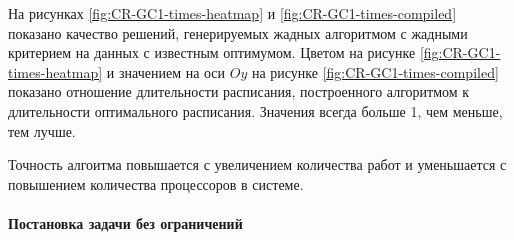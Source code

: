 На рисунках \ref{fig:CR-GC1-times-heatmap} и \ref{fig:CR-GC1-times-compiled} показано качество решений, генерируемых жадных алгоритмом с жадными критерием на данных с известным оптимумом. Цветом на рисунке \ref{fig:CR-GC1-times-heatmap} и значением на оси $Oy$ на рисунке \ref{fig:CR-GC1-times-compiled} показано отношение длительности расписания, построенного алгоритмом к длительности оптимального расписания. Значения всегда больше 1, чем меньше, тем лучше.

Точность алгоитма повышается с увеличением количества работ и уменьшается с повышением количества процессоров в системе. 




\paragraph{Постановка задачи без ограничений}

